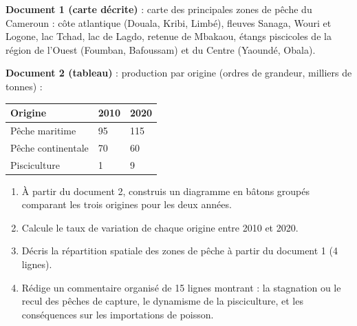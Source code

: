 \documentclass[11pt]{article}
\begin{document}
\begin{exercice}
\textbf{Document 1 (carte décrite)} : carte des principales zones de pêche du Cameroun : côte atlantique (Douala, Kribi, Limbé), fleuves Sanaga, Wouri et Logone, lac Tchad, lac de Lagdo, retenue de Mbakaou, étangs piscicoles de la région de l'Ouest (Foumban, Bafoussam) et du Centre (Yaoundé, Obala).

\textbf{Document 2 (tableau)} : production par origine (ordres de grandeur, milliers de tonnes) :

\begin{center}
\begin{tabularx}{\linewidth}{|l|X|X|}\hline
\rowcolor{popblueL} \textbf{Origine} & \textbf{2010} & \textbf{2020} \\ \hline
Pêche maritime & 95 & 115 \\ \hline
Pêche continentale & 70 & 60 \\ \hline
Pisciculture & 1 & 9 \\ \hline
\end{tabularx}
\end{center}

\begin{enumerate}
\item À partir du document 2, construis un diagramme en bâtons groupés comparant les trois origines pour les deux années.
\item Calcule le taux de variation de chaque origine entre 2010 et 2020.
\item Décris la répartition spatiale des zones de pêche à partir du document 1 (4 lignes).
\item Rédige un commentaire organisé de 15 lignes montrant : la stagnation ou le recul des pêches de capture, le dynamisme de la pisciculture, et les conséquences sur les importations de poisson.
\end{enumerate}
\end{exercice}
\end{document}
